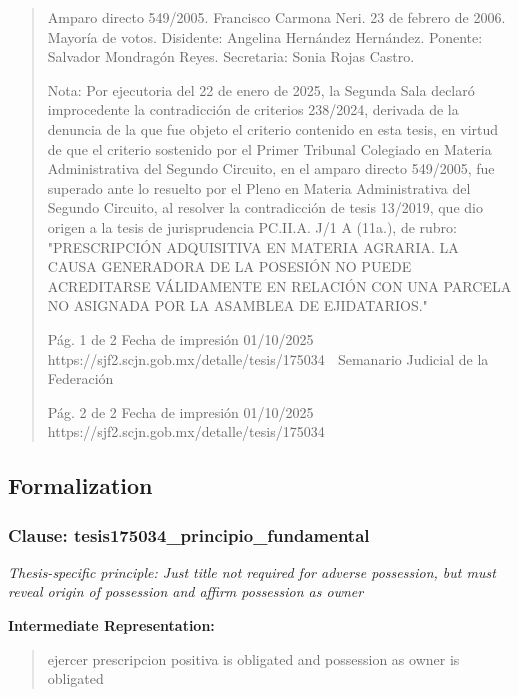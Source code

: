 \documentclass[11pt,a4paper]{article}
\begin{document}
\begin{quote}
Amparo directo 549/2005. Francisco Carmona Neri. 23 de febrero de 2006. Mayoría de votos.
Disidente: Angelina Hernández Hernández. Ponente: Salvador Mondragón Reyes. Secretaria: Sonia
Rojas Castro.

Nota: Por ejecutoria del 22 de enero de 2025, la Segunda Sala declaró improcedente
la contradicción de criterios 238/2024, derivada de la denuncia de la que fue objeto el criterio
contenido en esta tesis, en virtud de que el criterio sostenido por el Primer Tribunal Colegiado en
Materia Administrativa del Segundo Circuito, en el amparo directo 549/2005, fue superado ante lo
resuelto por el Pleno en Materia Administrativa del Segundo Circuito, al resolver la contradicción de
tesis 13/2019, que dio origen a la tesis de jurisprudencia PC.II.A. J/1 A (11a.), de rubro:
"PRESCRIPCIÓN ADQUISITIVA EN MATERIA AGRARIA. LA CAUSA GENERADORA DE LA
POSESIÓN NO PUEDE ACREDITARSE VÁLIDAMENTE EN RELACIÓN CON UNA PARCELA NO
ASIGNADA POR LA ASAMBLEA DE EJIDATARIOS."




                                             Pág. 1 de 2             Fecha de impresión 01/10/2025
  https://sjf2.scjn.gob.mx/detalle/tesis/175034
                                                Semanario Judicial de la Federación




                                           Pág. 2 de 2       Fecha de impresión 01/10/2025
https://sjf2.scjn.gob.mx/detalle/tesis/175034

\end{quote}

\subsection{Formalization}

\subsubsection{Clause: tesis175034\_principio\_fundamental}

\textit{Thesis-specific principle: Just title not required for adverse possession, but must reveal origin of possession and affirm possession as owner}

\textbf{Intermediate Representation:}

\begin{quote}
ejercer prescripcion positiva is obligated and possession as owner is obligated
\end{quote}
\end{document}
